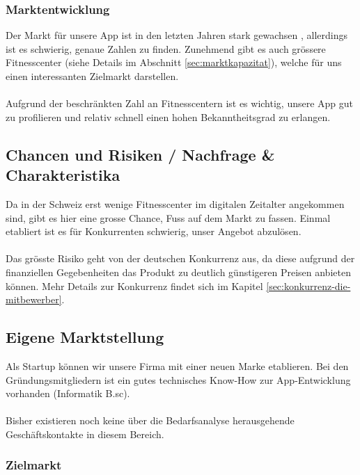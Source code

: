 \subsubsection{Marktentwicklung}
Der Markt für unsere App ist in den letzten Jahren stark gewachsen \cite{fitness-studios+1+milliarde}\cite{fitness+tribune}, allerdings ist es schwierig, genaue Zahlen zu finden. Zunehmend gibt es auch grössere Fitnesscenter (siehe Details im Abschnitt \ref{sec:marktkapazitat}), welche für uns einen interessanten Zielmarkt darstellen.
\\ \\
Aufgrund der beschränkten Zahl an Fitnesscentern ist es wichtig, unsere App gut zu profilieren und relativ schnell einen hohen Bekanntheitsgrad zu erlangen.

\subsection{Chancen und Risiken / Nachfrage \& Charakteristika}

Da in der Schweiz erst wenige Fitnesscenter im digitalen Zeitalter angekommen sind, gibt es hier eine grosse Chance, Fuss auf dem Markt zu fassen. Einmal etabliert ist es für Konkurrenten schwierig, unser Angebot abzulösen.
\\ \\
Das grösste Risiko geht von der deutschen Konkurrenz aus, da diese aufgrund der finanziellen Gegebenheiten das Produkt zu deutlich günstigeren Preisen anbieten können. Mehr Details zur Konkurrenz findet sich im Kapitel \ref{sec:konkurrenz-die-mitbewerber}.


\clearpage

\subsection{Eigene Marktstellung}

Als Startup können wir unsere Firma mit einer neuen Marke etablieren. Bei den Gründungsmitgliedern ist ein gutes technisches Know-How zur App-Entwicklung vorhanden (Informatik B.sc).
\\ \\
Bisher existieren noch keine über die Bedarfsanalyse herausgehende Geschäftskontakte in diesem Bereich.


\subsubsection{Zielmarkt}

